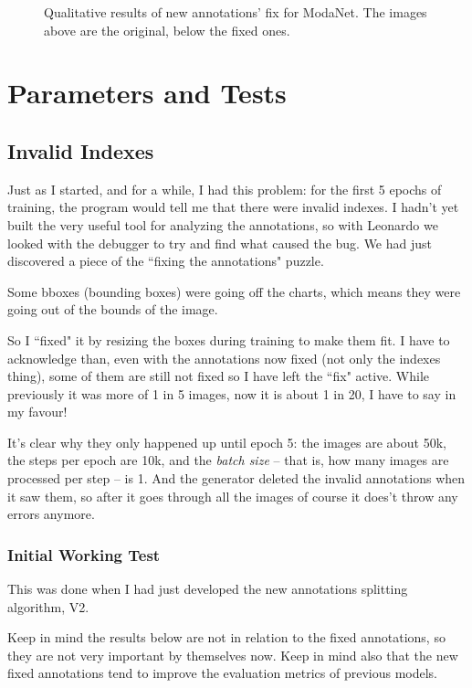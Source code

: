 \begin{figure}[H]
\begin{tabular}{ccc}
	\end{tabular}
	\caption{Qualitative results of new annotations' fix for ModaNet. The images above are the original, below the fixed ones.}
	\label{f:modanet-fix2} %
\end{figure}

\section{Parameters and Tests}\label{s:parameters-and-tests}

\subsection{Invalid Indexes}\label{s:indexes-invalid}

Just as I started, and for a while, I had this problem: for the first 5 epochs of training, the program would tell me that there were invalid indexes. I hadn't yet built the very useful tool for analyzing the annotations, so with Leonardo we looked with the debugger to try and find what caused the bug. We had just discovered a piece of the “fixing the annotations" puzzle.

Some bboxes (bounding boxes) were going off the charts, which means they were going out of the bounds of the image.

So I “fixed" it by resizing the boxes during training to make them fit. I have to acknowledge than, even with the annotations now fixed (not only the indexes thing), some of them are still not fixed so I have left the “fix" active. While previously it was more of 1 in 5 images, now it is about 1 in 20, I have to say in my favour!

It's clear why they only happened up until epoch 5: the images are about 50k, the steps per epoch are 10k, and the \emph{batch size} -- that is, how many images are processed per step -- is 1. And the generator deleted the invalid annotations when it saw them, so after it goes through all the images of course it does't throw any errors anymore.

\subsubsection{Initial Working Test}

This was done when I had just developed the new annotations splitting algorithm, V2. 

Keep in mind the results below are not in relation to the fixed annotations, so they are not very important by themselves now. Keep in mind also that the new fixed annotations tend to improve the evaluation metrics of previous models.

